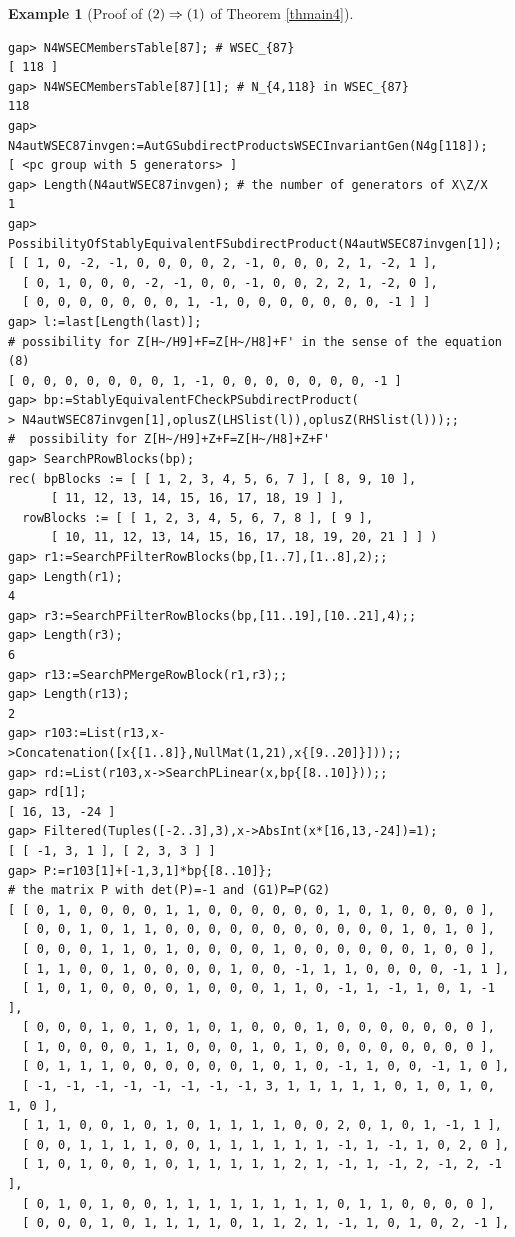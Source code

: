 \documentclass{amsart}
\theoremstyle{plain}
\theoremstyle{definition}
\newtheorem{example}[theorem]{Example}
\theoremstyle{remark}
\begin{document}
\begin{example}[Proof of ${\rm (2)}\Rightarrow {\rm (1)}$ of {Theorem \ref{thmain4}}]
\begin{verbatim}
gap> N4WSECMembersTable[87]; # WSEC_{87}
[ 118 ]
gap> N4WSECMembersTable[87][1]; # N_{4,118} in WSEC_{87}
118
gap> N4autWSEC87invgen:=AutGSubdirectProductsWSECInvariantGen(N4g[118]);
[ <pc group with 5 generators> ]
gap> Length(N4autWSEC87invgen); # the number of generators of X\Z/X
1
gap> PossibilityOfStablyEquivalentFSubdirectProduct(N4autWSEC87invgen[1]);
[ [ 1, 0, -2, -1, 0, 0, 0, 0, 2, -1, 0, 0, 0, 2, 1, -2, 1 ], 
  [ 0, 1, 0, 0, 0, -2, -1, 0, 0, -1, 0, 0, 2, 2, 1, -2, 0 ], 
  [ 0, 0, 0, 0, 0, 0, 0, 1, -1, 0, 0, 0, 0, 0, 0, 0, -1 ] ]
gap> l:=last[Length(last)]; 
# possibility for Z[H~/H9]+F=Z[H~/H8]+F' in the sense of the equation (8)
[ 0, 0, 0, 0, 0, 0, 0, 1, -1, 0, 0, 0, 0, 0, 0, 0, -1 ]
gap> bp:=StablyEquivalentFCheckPSubdirectProduct(
> N4autWSEC87invgen[1],oplusZ(LHSlist(l)),oplusZ(RHSlist(l)));;
#  possibility for Z[H~/H9]+Z+F=Z[H~/H8]+Z+F'
gap> SearchPRowBlocks(bp);
rec( bpBlocks := [ [ 1, 2, 3, 4, 5, 6, 7 ], [ 8, 9, 10 ], 
      [ 11, 12, 13, 14, 15, 16, 17, 18, 19 ] ], 
  rowBlocks := [ [ 1, 2, 3, 4, 5, 6, 7, 8 ], [ 9 ], 
      [ 10, 11, 12, 13, 14, 15, 16, 17, 18, 19, 20, 21 ] ] )
gap> r1:=SearchPFilterRowBlocks(bp,[1..7],[1..8],2);;
gap> Length(r1);
4
gap> r3:=SearchPFilterRowBlocks(bp,[11..19],[10..21],4);;
gap> Length(r3);
6
gap> r13:=SearchPMergeRowBlock(r1,r3);;
gap> Length(r13);
2
gap> r103:=List(r13,x->Concatenation([x{[1..8]},NullMat(1,21),x{[9..20]}]));;
gap> rd:=List(r103,x->SearchPLinear(x,bp{[8..10]}));;
gap> rd[1];
[ 16, 13, -24 ]
gap> Filtered(Tuples([-2..3],3),x->AbsInt(x*[16,13,-24])=1);
[ [ -1, 3, 1 ], [ 2, 3, 3 ] ]
gap> P:=r103[1]+[-1,3,1]*bp{[8..10]};
# the matrix P with det(P)=-1 and (G1)P=P(G2)
[ [ 0, 1, 0, 0, 0, 0, 1, 1, 0, 0, 0, 0, 0, 0, 1, 0, 1, 0, 0, 0, 0 ], 
  [ 0, 0, 1, 0, 1, 1, 0, 0, 0, 0, 0, 0, 0, 0, 0, 0, 0, 1, 0, 1, 0 ], 
  [ 0, 0, 0, 1, 1, 0, 1, 0, 0, 0, 0, 1, 0, 0, 0, 0, 0, 0, 1, 0, 0 ], 
  [ 1, 1, 0, 0, 1, 0, 0, 0, 0, 1, 0, 0, -1, 1, 1, 0, 0, 0, 0, -1, 1 ], 
  [ 1, 0, 1, 0, 0, 0, 0, 1, 0, 0, 0, 1, 1, 0, -1, 1, -1, 1, 0, 1, -1 ], 
  [ 0, 0, 0, 1, 0, 1, 0, 1, 0, 1, 0, 0, 0, 1, 0, 0, 0, 0, 0, 0, 0 ], 
  [ 1, 0, 0, 0, 0, 1, 1, 0, 0, 0, 1, 0, 1, 0, 0, 0, 0, 0, 0, 0, 0 ], 
  [ 0, 1, 1, 1, 0, 0, 0, 0, 0, 0, 1, 0, 1, 0, -1, 1, 0, 0, -1, 1, 0 ], 
  [ -1, -1, -1, -1, -1, -1, -1, -1, 3, 1, 1, 1, 1, 1, 0, 1, 0, 1, 0, 1, 0 ], 
  [ 1, 1, 0, 0, 1, 0, 1, 0, 1, 1, 1, 1, 0, 0, 2, 0, 1, 0, 1, -1, 1 ], 
  [ 0, 0, 1, 1, 1, 1, 0, 0, 1, 1, 1, 1, 1, 1, -1, 1, -1, 1, 0, 2, 0 ], 
  [ 1, 0, 1, 0, 0, 1, 0, 1, 1, 1, 1, 1, 2, 1, -1, 1, -1, 2, -1, 2, -1 ], 
  [ 0, 1, 0, 1, 0, 0, 1, 1, 1, 1, 1, 1, 1, 1, 0, 1, 1, 0, 0, 0, 0 ], 
  [ 0, 0, 0, 1, 0, 1, 1, 1, 1, 0, 1, 1, 2, 1, -1, 1, 0, 1, 0, 2, -1 ], 

\end{verbatim}
\end{example}
\end{document}
